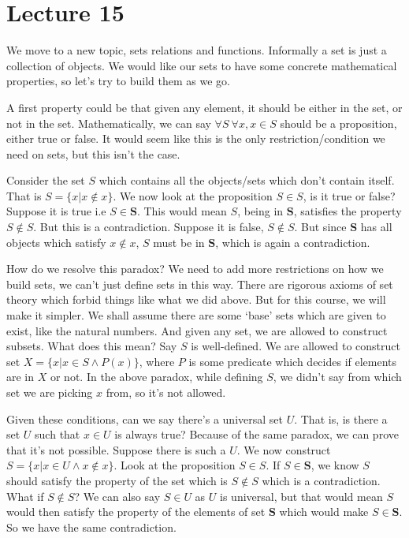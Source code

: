 \documentclass[a4paper,10pt]{article}
\theoremstyle{definition} %
\begin{document}
    \section{Lecture 15}

    We move to a new topic, sets relations and functions. Informally a set is just a collection 
    of objects. We would like our sets to have some concrete mathematical properties, so
    let's try to build them as we go.

    A first property could be that given any element, it should be either in the set, or not in 
    the set. Mathematically, we can say $\forall S \ \forall x, x \in S$ should be a proposition, 
    either true or false. It would seem like this is the only restriction/condition we need on sets,
    but this isn't the case.

    Consider the set $S$ which contains all the objects/sets which don't contain itself. That is
    $S = \{x | x \notin x\}$. We now look at the proposition $S \in S$, is it true or false?
    Suppose it is true i.e $S \in \textbf{S}$. This would mean $S$, being in $\textbf{S}$, satisfies
    the property $S \notin S$. But this is a contradiction. Suppose it is false, $S \notin S$.
    But since $\textbf{S}$ has all objects which satisfy $x \notin x$, $S$ must be in $\textbf{S}$,
    which is again a contradiction.

    How do we resolve this paradox? We need to add more restrictions on how we build sets, we can't 
    just define sets in this way. There are rigorous axioms of set theory which forbid things like 
    what we did above. But for this course, we will make it simpler. We shall assume there are some
    `base' sets which are given to exist, like the natural numbers. And given any set, we are allowed
    to construct subsets. What does this mean? Say $S$ is well-defined. We are allowed to construct
    set $X = \{x | x \in S \land P(x)\}$, where $P$ is some predicate which decides if elements are in $X$
    or not. In the above paradox, while defining $S$, we didn't say from which set we are picking $x$
    from, so it's not allowed.

    Given these conditions, can we say there's a universal set $U$. That is, is there a set $U$ such 
    that $x \in U$ is always true? Because of the same paradox, we can prove that it's not possible.
    Suppose there is such a $U$. We now construct $S = \{x| x \in U \land x \notin x \}$. Look at 
    the proposition $S \in S$. If $S \in \textbf{S}$, we know $S$ should satisfy the property of the 
    set which is $S \notin S$ which is a contradiction. What if $S \notin S$? We can also 
    say $S \in U$ as $U$ is universal, but that would mean $S$ would then satisfy the property of
    the elements of set $\textbf{S}$ which would make $S \in \textbf{S}$. So we have the same
    contradiction.
\end{document}
